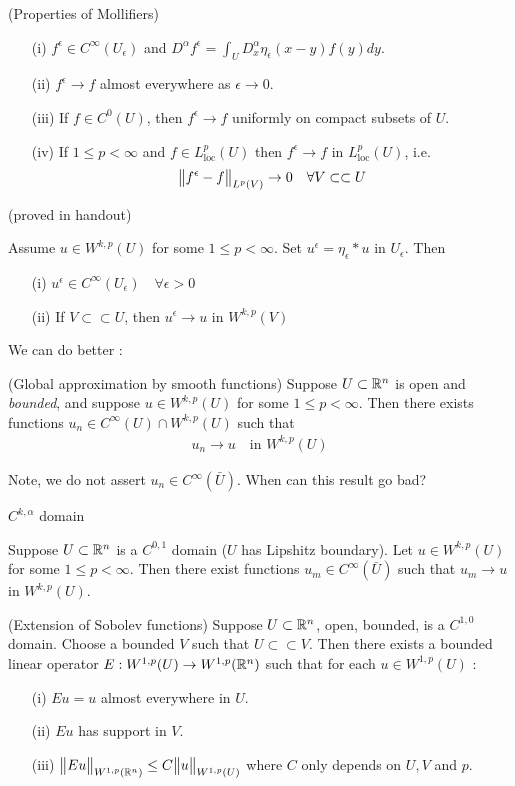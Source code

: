 \documentclass[10pt,a4paper]{report}
\begin{document}
\thm (Properties of Mollifiers) \begin{itemize}
\item[(i)] $f^{\epsilon} \in C^{\infty}(U_{\epsilon})$ and $D^{\alpha}f^{\epsilon} = \int_U D^{\alpha}_x \eta_{\epsilon}(x-y)f(y) dy$.
\item[(ii)] $f^{\epsilon}\rightarrow f$ almost everywhere as $\epsilon \rightarrow 0$.
\item[(iii)] If $f\in C^0 (U)$, then $f^{\epsilon} \rightarrow f$ uniformly on compact subsets of $U$.
\item[(iv)] If $1\leq p <\infty$ and $f \in L^p_{\text{loc}}(U)$ then $f^{\epsilon} \rightarrow f$ in $L^p_{\text{loc}}(U)$, i.e.
\begin{align*}
\bigl\lVert f^{\epsilon} - f\bigr\rVert_{L^p(V)} \rightarrow 0 \quad \forall V \subset\subset U
\end{align*}
\end{itemize}
(proved in handout)
\s

\lem Assume $u \in W^{k,p}(U)$ for some $1\leq p < \infty$. Set $u^{\epsilon} = \eta_{\epsilon} * u$ in $U_{\epsilon}$. Then
\begin{itemize}
\item[(i)] $u^{\epsilon} \in C^{\infty}(U_{\epsilon}) \quad \forall \epsilon >0$
\item[(ii)] If $V \subset \subset U$, then $u^{\epsilon} \rightarrow u$ in $W^{k,p}(V)$
\end{itemize}
\s

We can do better :
\s

\thm (Global approximation by smooth functions) Suppose $U\subset \mathbb{R}^n$ is open and \emph{bounded}, and suppose $u\in W^{k,p}(U)$ for some $1\leq p<\infty$. Then there exists functions $u_n \in C^{\infty}(U) \cap W^{k,p}(U)$ such that
\begin{align*}
u_n \rightarrow u \quad \text{in } W^{k,p}(U)
\end{align*}
\s

Note, we do not assert $u_n \in C^{\infty}(\bar{U})$. When can this result go bad?
\s

 $C^{k,\alpha}$ domain
\s

\thm Suppose $U \subset \mathbb{R}^n$ is a $C^{0,1}$ domain ($U$ has Lipshitz boundary). Let $u\in W^{k,p}(U)$ for some $1\leq p <\infty$. Then there exist functions $u_m \in C^{\infty}(\bar{U})$ such that $u_m \rightarrow u$ in $W^{k,p}(U)$.
\s

\thm (Extension of Sobolev functions) Suppose $U\subset \mathbb{R}^n$, open, bounded, is a $C^{1,0}$ domain. Choose a bounded $V$ such that $U \subset\subset V$. Then there exists a bounded linear operator $E : W^{1,p}(U) \rightarrow W^{1,p}(\mathbb{R}^n)$ such that for each $u \in W^{1,p}(U)$ :
\begin{itemize}
\item[(i)] $Eu =u$ almost everywhere in $U$.
\item[(ii)] $Eu$ has support in $V$.
\item[(iii)] $\bigl\lVert Eu\bigr\rVert_{W^{1,p}(\mathbb{R}^n)} \leq C \bigl\lVert u\bigr\rVert_{W^{1,p}(U)}$ where $C$ only depends on $U,V$ and $p$.
\end{itemize}
\s
\end{document}
